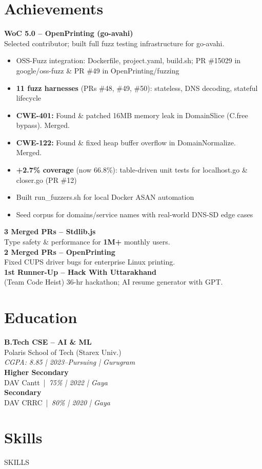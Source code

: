 \documentclass[a4paper,9.5pt]{article}
\begin{document}
\noindent\begin{minipage}[t]{0.285\textwidth}%

\section{Achievements}
{\fontsize{7.8}{10}\selectfont

\textbf{\color{accentblue}WoC 5.0 -- OpenPrinting (go-avahi)}\\
Selected contributor; built full fuzz testing infrastructure for go-avahi.
\begin{itemize}
  \item OSS-Fuzz integration: Dockerfile, project.yaml, build.sh; PR \#15029 in google/oss-fuzz \& PR \#49 in OpenPrinting/fuzzing
  \item \textbf{11 fuzz harnesses} (PRs \#48, \#49, \#50): stateless, DNS decoding, stateful lifecycle
  \item \textbf{CWE-401:} Found \& patched 16MB memory leak in DomainSlice (C.free bypass). Merged.
  \item \textbf{CWE-122:} Found \& fixed heap buffer overflow in DomainNormalize. Merged.
  \item \textbf{+2.7\% coverage} (now 66.8\%): table-driven unit tests for localhost.go \& closer.go (PR \#12)
  \item Built run\_fuzzers.sh for local Docker ASAN automation
  \item Seed corpus for domains/service names with real-world DNS-SD edge cases
\end{itemize}

\vspace{2pt}
\textbf{3 Merged PRs -- Stdlib.js}\\
Type safety \& performance for \textbf{1M+} monthly users.\\[2pt]
\textbf{2 Merged PRs -- OpenPrinting}\\
Fixed CUPS driver bugs for enterprise Linux printing.\\[2pt]
\textbf{1st Runner-Up -- Hack With Uttarakhand}\\
(Team Code Heist) 36-hr hackathon; AI resume generator with GPT.
}

\section{Education}
{\fontsize{8.2}{10.5}\selectfont
\textbf{\color{accentblue}B.Tech CSE -- AI \& ML}\\
Polaris School of Tech (Starex Univ.)\\
\textit{CGPA: 8.85 | 2023--Pursuing | Gurugram}\\[2pt]
\textbf{Higher Secondary}\\
DAV Cantt\ |\ \textit{75\% | 2022 | Gaya}\\[2pt]
\textbf{Secondary}\\
DAV CRRC\ |\ \textit{80\% | 2020 | Gaya}
}

\section{Skills}
{\fontsize{8.2}{10.5}\selectfont
{{SKILLS}}
}

\end{minipage}%
\end{document}
